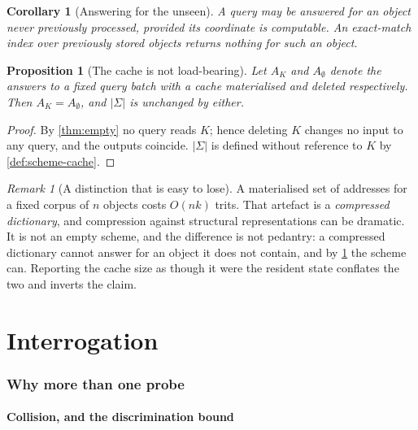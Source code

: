 \documentclass[11pt,twocolumn,a4paper]{article}
\theoremstyle{plain}
\newtheorem{proposition}[theorem]{Proposition}
\newtheorem{corollary}[theorem]{Corollary}
\theoremstyle{definition}
\theoremstyle{remark}
\newtheorem{remark}[theorem]{Remark}
\begin{document}
\begin{corollary}[Answering for the unseen]
\label{cor:no-entry}
A query may be answered for an object never previously processed, provided its
coordinate is computable. An exact-match index over previously stored objects
returns nothing for such an object.
\end{corollary}

\begin{proposition}[The cache is not load-bearing]
\label{prop:cache-optional}
Let $A_{K}$ and $A_{\emptyset}$ denote the answers to a fixed query batch with
a cache materialised and deleted respectively. Then $A_{K} = A_{\emptyset}$, and
$|\Sigma|$ is unchanged by either.
\end{proposition}

\begin{proof}
By \cref{thm:empty} no query reads $K$; hence deleting $K$ changes no input to
any query, and the outputs coincide. $|\Sigma|$ is defined without reference to
$K$ by \cref{def:scheme-cache}.
\end{proof}

\begin{remark}[A distinction that is easy to lose]
\label{rem:compressed-vs-empty}
A materialised set of addresses for a fixed corpus of $n$ objects costs
$O(nk)$ trits. That artefact is a \emph{compressed dictionary}, and compression
against structural representations can be dramatic. It is not an empty scheme,
and the difference is not pedantry: a compressed dictionary cannot answer for an
object it does not contain, and by \cref{cor:no-entry} the scheme can. Reporting
the cache size as though it were the resident state conflates the two and
inverts the claim.
\end{remark}

\part{Interrogation}

\section{Why more than one probe}
\label{sec:panel}

\subsection{Collision, and the discrimination bound}
\end{document}
